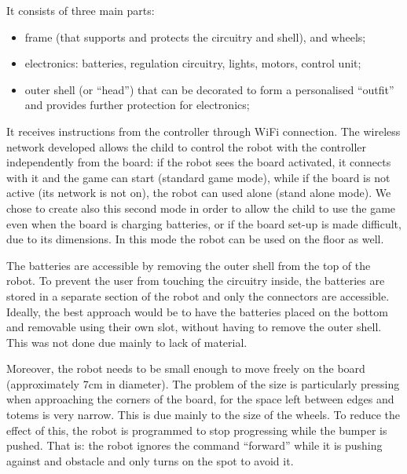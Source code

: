 \documentclass[a4paper,twoside]{book}
\begin{document}
\beforelist It consists of three main parts:
\begin{itemize}
\item frame (that supports and protects the circuitry and shell), and wheels;
\item electronics: batteries, regulation circuitry, lights, motors, control unit;
\item outer shell (or \textquotedblleft{}head\textquotedblright{}) that can be decorated to form a personalised \textquotedblleft{}outfit\textquotedblright{}  and provides further protection for electronics;
\end{itemize}
\afterlist*
It receives instructions from the controller through WiFi connection. The wireless network developed allows the child to control the robot with the controller independently from the board: if the robot sees the board activated, it connects with it and the game can start (standard game mode), while if the board is not active (its network is not on), the robot can used alone (stand alone mode). We chose to create also this second mode in order to allow the child to use the game even when the board is charging batteries, or if the board set-up is made difficult, due to its dimensions. In this mode the robot can be used on the floor as well.

The batteries are accessible by removing the outer shell from the top of the robot. To prevent the user from touching the circuitry inside, the batteries are stored in a separate section of the robot and only the connectors are accessible.
Ideally, the best approach would be to have the batteries placed on the bottom and removable using their own slot, without having to remove the outer shell. This was not done due mainly to lack of material.

Moreover, the robot needs to be small enough to move freely on the board (approximately 7cm in diameter). The problem of the size is particularly pressing when approaching the corners of the board, for the space left between edges and totems is very narrow. This is due mainly to the size of the wheels. To reduce the effect of this, the robot is programmed to stop progressing while the bumper is pushed. That is: the robot ignores the command \textquotedblleft{}forward\textquotedblright{}  while it is pushing against and obstacle and only turns on the spot to avoid it.
\end{document}
